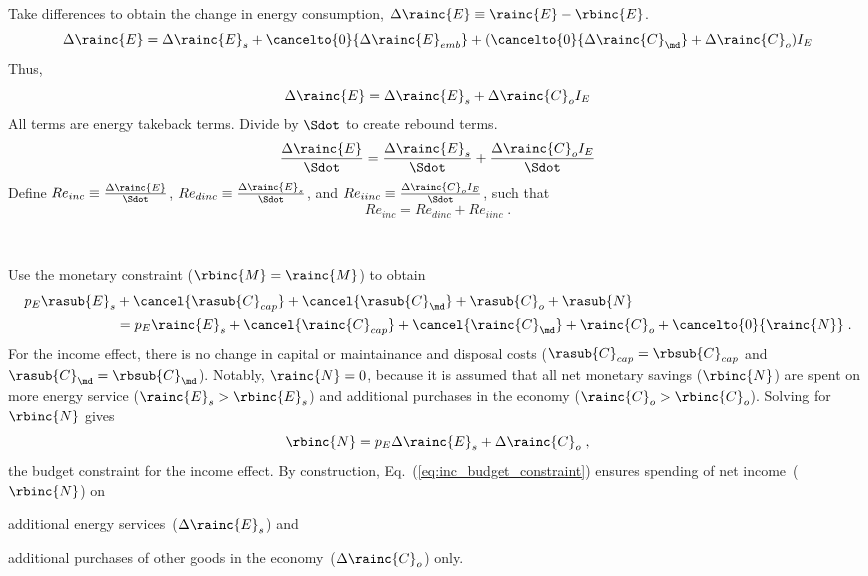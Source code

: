 \begin{landscape}
{Take differences to obtain the change in energy consumption, $\Delta \rainc{E} \equiv \rainc{E} - \rbinc{E}$.
%
\begin{equation}
  \Delta \rainc{E} = \Delta \rainc{E}_s 
                     + \cancelto{0}{\Delta \rainc{E}_{emb}}
                     + (\cancelto{0}{\Delta \rainc{C}_{\md}} + \Delta \rainc{C}_o) I_E
\end{equation}
%
Thus, 
%
\begin{equation}
  \Delta \rainc{E} = \Delta \rainc{E}_s + \Delta \rainc{C}_o I_E
\end{equation}
%
All terms are energy takeback terms.
Divide by $\Sdot$
to create rebound terms.
%
\begin{equation}
  \frac{\Delta \rainc{E}}{\Sdot} = \frac{\Delta \rainc{E}_s}{\Sdot} + \frac{\Delta \rainc{C}_o I_E}{\Sdot}
\end{equation}
%
Define 
$Re_{inc} \equiv \frac{\Delta \rainc{E}}{\Sdot}$, 
$Re_{dinc} \equiv \frac{\Delta \rainc{E}_s}{\Sdot}$, and 
$Re_{iinc} \equiv \frac{\Delta \rainc{C}_o I_E}{\Sdot}$,
such that
%
\begin{equation} \label{eq:Re_inc_def}
  Re_{inc} = Re_{dinc} + Re_{iinc} \; .
\end{equation}
%
}
{
~

Use the monetary constraint ($\rbinc{M} = \rainc{M}$) to obtain
%
\begin{align}
  p_E \rasub{E}_s &+ \cancel{\rasub{C}_{cap}} + \cancel{\rasub{C}_{\md}} + \rasub{C}_o + \rasub{N} \nonumber \\
                  &= p_E \rainc{E}_s + \cancel{\rainc{C}_{cap}} + \cancel{\rainc{C}_{\md}} + \rainc{C}_o + \cancelto{0}{\rainc{N}} \; .
\end{align}
%
For the income effect, there is no change in capital or maintainance and disposal costs
($\rasub{C}_{cap} = \rbsub{C}_{cap}$ and $\rasub{C}_{\md} = \rbsub{C}_{\md}$).
Notably, $\rainc{N} = 0$,
because it is assumed that all net monetary savings ($\rbinc{N}$) are spent on
more energy service ($\rainc{E}_s > \rbinc{E}_s$)
and
additional purchases in the economy ($\rainc{C}_o > \rbinc{C}_o$).
Solving for $\rbinc{N}$ gives 
%
\begin{equation} \label{eq:inc_budget_constraint}
  \rbinc{N} = p_E \Delta \rainc{E}_s + \Delta \rainc{C}_o \; ,
\end{equation}
%
the budget constraint for the income effect.
By construction, 
Eq.~(\ref{eq:inc_budget_constraint}) ensures
spending of net income~($\rbinc{N}$) on
%
\begin{enumerate*}[label={(\roman*)}]
	
  \item additional energy services~($\Delta \rainc{E}_s$) and
  
  \item additional purchases of other goods in the economy~($\Delta \rainc{C}_o$) only.
    
\end{enumerate*}
}
\end{landscape}
